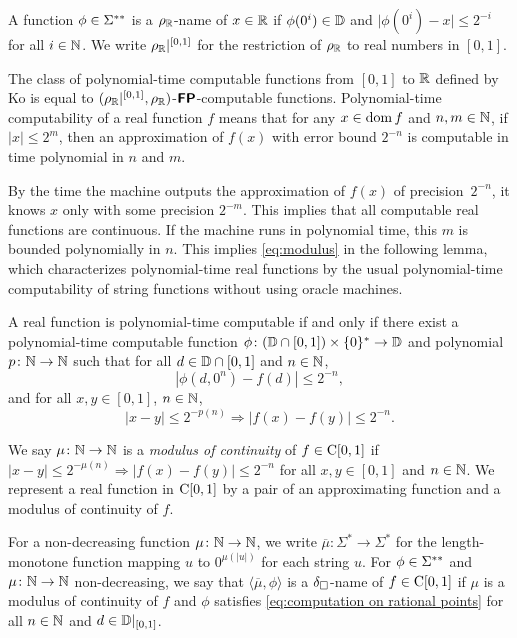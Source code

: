 \documentclass[envcountsame,orivec,oribibl]{llncs}
\begin{document}
A function $\phi \in \Sigma ^{**}$ is a $\rho _\mathbb R$-name of $x \in \mathbb R$ 
if $\phi(0^i) \in \mathbb D$ and $\lvert \phi(0^i) - x \rvert \le 2^{-i}$
for all $i \in \mathbb N$.
We write $\rho _\mathbb R|^{[0,1]}$ for the restriction of $\rho _\mathbb R$ to real numbers in $[0,1]$.

The class of polynomial-time computable functions from $[0,1]$ to $\mathbb R$ 
defined by Ko is equal to
$(\rho _\mathbb R|^{[0,1]},\rho _\mathbb R)$-$\text{\bfseries \sffamily \upshape FP}$-computable functions.
Polynomial-time computability of a real function $f$ means that
for any $x \in \mathop{\rm dom} f$ and $n,m \in \mathbb N$, 
if $|x| \le 2^m$, then
an approximation of $f(x)$ with error bound $2^{-n}$
is computable in time polynomial in $n$ and $m$.

By the time the machine outputs the approximation of $f (x)$ of precision~$2 ^{-n}$, 
it knows $x$ only with some precision $2 ^{-m}$.
This implies that all computable real functions are continuous.
If the machine runs in polynomial time,
this $m$ is bounded polynomially in $n$.
This implies \eqref{eq:modulus} in the following lemma, 
which characterizes polynomial-time real functions
by the usual polynomial-time computability of string functions 
without using oracle machines. 

\begin{lemma}
 \label{lem:type1representation}
 A real function is polynomial-time computable if and only if
 there exist a polynomial-time computable function 
 $\phi \colon (\mathbb D \cap [0, 1]) \times \{0\} ^* \to \mathbb D$ and 
 polynomial $p \colon \mathbb N \to \mathbb N$ such that
 for all $d \in \mathbb D \cap [0,1]$ and $n \in \mathbb N$,
 \begin{equation}
   \label{eq:computation on rational points}
  |\phi(d, 0^n) - f(d)| \le 2^{-n},
 \end{equation}
 and for all $x, y \in [0, 1]$, $n \in \mathbb N$,
 \begin{equation} 
  |x-y| \le 2^{-p(n)} \Rightarrow |f(x) - f(y)| \le 2^{-n}.
   \label{eq:modulus}
 \end{equation}
\end{lemma}

We say $\mu \colon \mathbb N \to \mathbb N$ is a {\em modulus of continuity} of $f \in \mathrm C[0,1]$
if $|x - y| \le 2^{-\mu(n)} \Rightarrow |f(x) - f(y)| \le 2^{-n}$ for all $x, y \in [0,1]$ and $n \in \mathbb N$.
We represent a real function in $\mathrm C[0,1]$ by a pair of
an approximating function and a modulus of continuity of $f$.

For a non-decreasing function $\mu \colon \mathbb N \to \mathbb N$, 
we write $\overline \mu \colon \Sigma^* \to \Sigma^*$ for the length-monotone
function mapping $u$ to $0^{\mu(|u|)}$ for each string $u$.
For $\phi \in \Sigma ^{**}$ and $\mu \colon \mathbb N \to \mathbb N$ non-decreasing,
we say that $\langle \overline{\mu}, \phi \rangle$ is a $\delta _\square$-name of $f \in \mathrm C[0,1]$
if $\mu$ is a modulus of continuity of $f$
and $\phi$ satisfies \eqref{eq:computation on rational points}
for all $n \in \mathbb N$ and $d \in \mathbb D|_{[0,1]}$.
\end{document}
